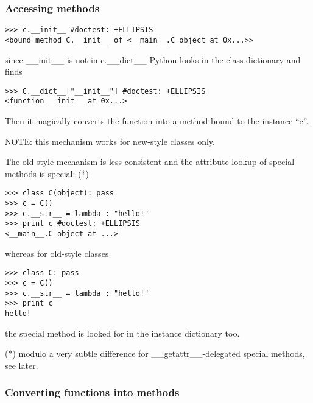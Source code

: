 \documentclass[10pt,a4paper,english]{article}
\begin{document}

\hypertarget{accessing-methods}{}
\subsubsection*{Accessing methods}
\begin{verbatim}>>> c.__init__ #doctest: +ELLIPSIS
<bound method C.__init__ of <__main__.C object at 0x...>>\end{verbatim}

since {\_}{\_}init{\_}{\_} is not in c.{\_}{\_}dict{\_}{\_} Python looks in the class dictionary 
and finds
\begin{verbatim}>>> C.__dict__["__init__"] #doctest: +ELLIPSIS
<function __init__ at 0x...>\end{verbatim}

Then it magically converts the function into a method bound to the instance
``c''.

NOTE: this mechanism works for new-style classes only.

The old-style mechanism is less consistent and the attribute lookup of special
methods is special: (*)
\begin{verbatim}>>> class C(object): pass
>>> c = C()
>>> c.__str__ = lambda : "hello!"
>>> print c #doctest: +ELLIPSIS
<__main__.C object at ...>\end{verbatim}

whereas for old-style classes
\begin{verbatim}>>> class C: pass
>>> c = C()
>>> c.__str__ = lambda : "hello!"
>>> print c 
hello!\end{verbatim}

the special method is looked for in the instance dictionary too.

(*) modulo a very subtle difference for {\_}{\_}getattr{\_}{\_}-delegated special methods,
see later.



\hypertarget{converting-functions-into-methods}{}
\subsubsection*{Converting functions into methods}
\end{document}

